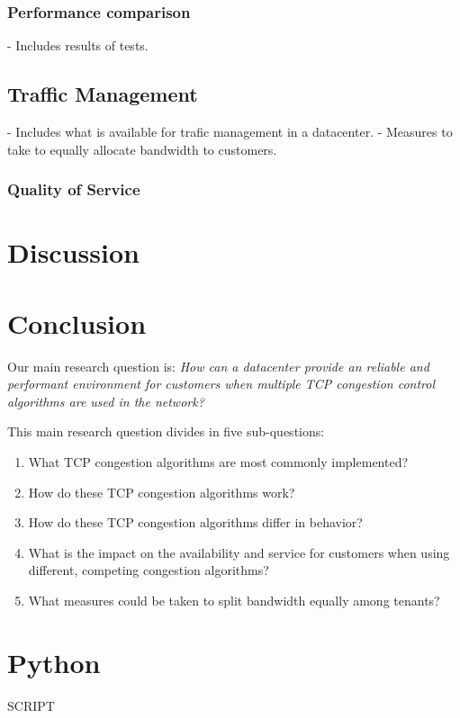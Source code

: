\documentclass{article}
\begin{document}
		\subsubsection{Performance comparison}	
		- Includes results of tests.
	
	\subsection{Traffic Management}
	- Includes what is available for trafic management in a datacenter.
	- Measures to take to equally allocate bandwidth to customers.
		\subsubsection{Quality of Service}
			
		
		

\section{Discussion}


\section{Conclusion}


Our main research question is:
{\it How can a datacenter provide an reliable and performant environment for
customers when multiple TCP congestion control algorithms are used in the
network?}

\vspace{0.5cm}

This main research question divides in five sub-questions:

\begin{enumerate}
	\item What TCP congestion algorithms are most commonly implemented?
	\item How do these TCP congestion algorithms work?
	\item How do these TCP congestion algorithms differ in behavior?
	\item What is the impact on the availability and service for customers when using different, competing congestion algorithms?
	\item What measures could be taken to split bandwidth equally among tenants?
\end{enumerate}


\printbibliography

\appendix
\section{Python}
\label{appendix:python}
SCRIPT
\end{document}

